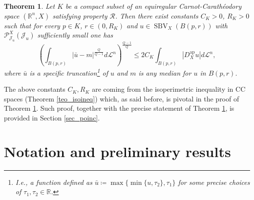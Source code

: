 \documentclass[12pt,a4paper]{amsart}
\theoremstyle{definition}
\theoremstyle{plain}
\newtheorem{teo}[defi]{Theorem}
\newcommand{\R}{\mathbb{R}}
\newcommand{\ceq}{\coloneqq}
\newcommand{\pxu}{{\mathcal{P}^X_{\mathcal{J}_u}}}
\newcommand{\leb}{\mathcal{L}}
\newcommand{\sbv}{\operatorname{SBV}}
\newcommand{\J}{\mathcal{J}}
\newcommand{\ap}{{\operatorname{ap}}}
\begin{document}
\begin{teo}\label{teo_intropoincare}
 Let $K$ be a compact subset of an equiregular Carnot-Carathéodory space $(\R^n,X)$ satisfying property $\mathcal R$. Then there exist constants $C_K>0$, $R_K>0$ such that for every $p \in K$, $r \in (0,R_K)$ and $u \in \sbv_X(B(p,r))$ with $\pxu(\J_u)$ sufficiently small one has
    \[
   \left( \int_{B(p,r)} |\bar u-m|^\frac{Q}{Q-1}d\leb^n \right)^\frac{Q-1}{Q}\leq 2 C_K \int_{B(p,r)}|D^\ap_Xu|d\leb^n,
    \]
    where $\bar u$ is a specific truncation\footnote{I.e., a function defined as $\bar u \ceq \max\{ \min\{u,\tau_2\},\tau_1\}$ for some precise choices of $\tau_1,\tau_2 \in \R$.} of $u$ and $m$ is any median for $u$ in $B(p,r)$.
\end{teo}
 The above constants $C_K,R_K$ are coming from the isoperimetric inequality in CC spaces (Theorem \ref{teo_isoineq}) which, as said before, is pivotal in the proof of Theorem \ref{teo_intropoincare}. Such proof, together with the precise statement of Theorem \ref{teo_intropoincare}, is provided in Section \ref{sec_poinc}. 


 
\section{Notation and preliminary results}\label{sec_prel}
\end{document}
